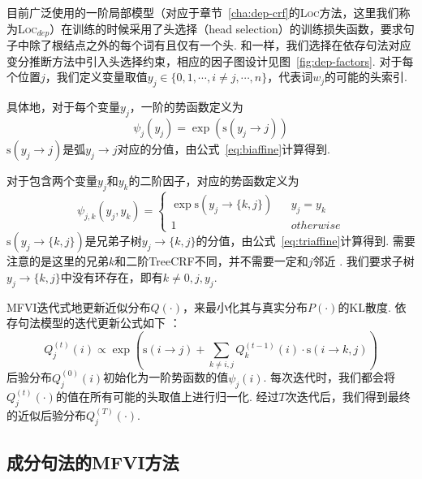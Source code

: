 目前广泛使用的一阶局部模型（对应于章节~\ref{cha:dep-crf}的\textsc{Loc}方法，这里我们称为\textsc{Loc}$_{dep}$）在训练的时候采用了头选择（head selection）的训练损失函数，要求句子中除了根结点之外的每个词有且仅有一个头.
和\citet{wang-tu-2020-second}一样，我们选择在依存句法对应变分推断方法中引入头选择约束，相应的因子图设计见图~\ref{fig:dep-factors}.
对于每个位置$j$，我们定义变量取值$y_j\in \{0,1,\cdots,i\neq j,\cdots,n\}$，代表词$w_j$的可能的头索引.

具体地，对于每个变量$y_j$，一阶的势函数定义为
\begin{equation}
	\label{eq:dep-1o-potential}
	\psi_j(y_j)=\exp(\mathrm{s}(y_j\rightarrow j))
\end{equation}
$\mathrm{s}(y_j\rightarrow j)$是弧$y_j\rightarrow j$对应的分值，由公式~\ref{eq:biaffine}计算得到.

对于包含两个变量$y_{j}$和$y_{k}$的二阶因子，对应的势函数定义为
\begin{equation}
	\label{eq:2o-dep-potential}
	\psi_{j,k}(y_j,y_k)=\left\{
	\begin{array}{rcl}
		\exp \mathrm{s}(y_j\rightarrow \{k,j\}) &   & {y_j=y_k}   \\
		1                                       &   & {otherwise}
	\end{array}
	\right.
\end{equation}
$\mathrm{s}(y_j\rightarrow \{k,j\})$是兄弟子树$y_j\rightarrow \{k,j\}$的分值，由公式~\ref{eq:triaffine}计算得到.
需要注意的是这里的兄弟$k$和二阶TreeCRF不同，并不需要一定和$j$邻近 \citep{smith-eisner-2008-dependency}.
我们要求子树$y_j\rightarrow \{k,j\}$中没有环存在，即有$k\neq {0,j,y_j}$.

MFVI迭代式地更新近似分布$Q(\cdot)$，来最小化其与真实分布$P(\cdot)$的KL散度.
依存句法模型的迭代更新公式如下 \citep{wang-tu-2020-second}：
\begin{equation}
	\label{eq:mfvi-dep}
	Q_{j}^{(t)}(i)\propto \exp\left(\mathrm{s}(i\rightarrow j) +\sum_{k\neq i,j} Q_{k}^{(t-1)}(i)\cdot \mathrm{s}(i\rightarrow {k,j}) \right)
\end{equation}
后验分布$Q_j^{(0)}(i)$初始化为一阶势函数的值$\psi_j(i)$.
每次迭代时，我们都会将$Q_j^{(t)}(\cdot)$的值在所有可能的头取值上进行归一化.
经过$T$次迭代后，我们得到最终的近似后验分布$Q_j^{(T)}(\cdot)$.

\subsection{成分句法的MFVI方法}\label{sec:con-vi}

